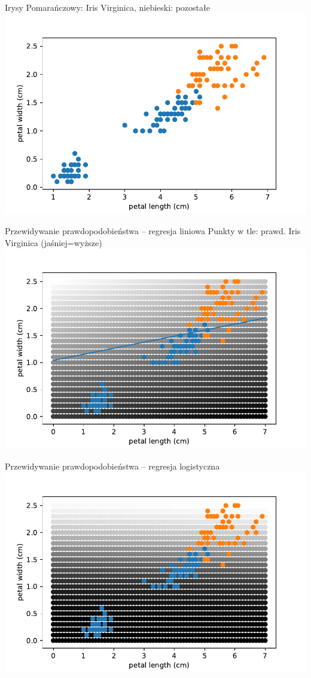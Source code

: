 \documentclass{sa}
\begin{document}
\begin{frame}{Irysy}
Pomarańczowy: Iris Virginica, niebieski: pozostałe
\includegraphics[width=\textwidth]{iris-simplified.pdf}
\end{frame}

\begin{frame}{Przewidywanie prawdopodobieństwa -- regresja liniowa}
Punkty w tle: prawd. Iris Virginica (jaśniej=wyższe)
\includegraphics[width=\textwidth]{iris-simplified-linreg.pdf}
\end{frame}

\begin{frame}{Przewidywanie prawdopodobieństwa -- regresja logistyczna}
\includegraphics[width=\textwidth]{iris-simplified-logreg.pdf}
\end{frame}
\end{document}
